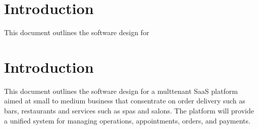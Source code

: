 \documentclass[]{VUMIFTemplateClass}
\begin{document}




\section{Introduction}
This document outlines the software design for

\section{Introduction}
This document outlines the software design for a multtenant SaaS platform
aimed at small to medium business that consentrate on order delivery such as
bars, restaurants and services such as spas and salons. The platform will
provide a unified system for managing operations, appointments, orders, and
payments.







\end{document}
